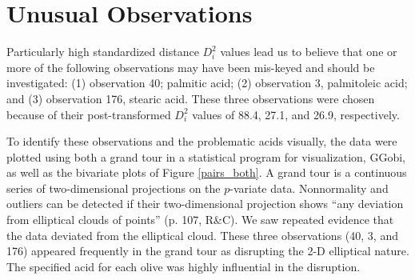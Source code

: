 \section{Unusual Observations}


Particularly high standardized distance $D_i^2$ values lead us to believe that one or more of the following observations may have been mis-keyed and should be investigated: (1) observation 40; palmitic acid; (2) observation 3, palmitoleic acid; and (3) observation 176, stearic acid. These three observations were chosen because of their post-transformed $D_i^2$ values of 88.4, 27.1, and 26.9, respectively.

To identify these observations and the problematic acids visually, the data were plotted using both a grand tour in a statistical program for visualization, GGobi, as well as the bivariate plots of Figure \ref{pairs_both}. A grand tour is a continuous series of two-dimensional projections on the $p$-variate data. Nonnormality and outliers can be detected if their two-dimensional projection shows ``any deviation from elliptical clouds of points'' (p. 107, R\&C). We saw repeated evidence that the data deviated from the elliptical cloud. These three observations (40, 3, and 176) appeared frequently in the grand tour as disrupting the 2-D elliptical nature. The specified acid for each olive was highly influential in the disruption.

